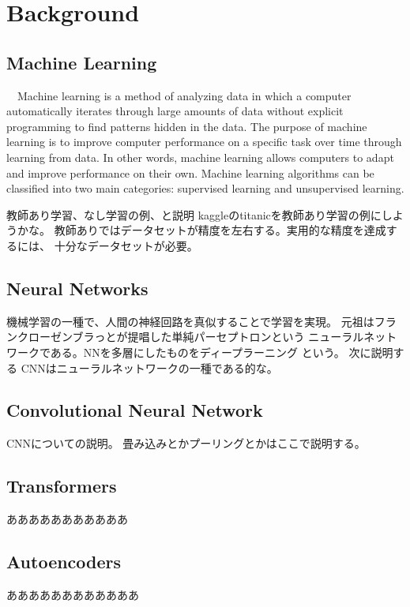 \chapter{Background}
\section{Machine Learning}

　Machine learning is a method of analyzing data in which a 
computer automatically iterates through large amounts of data 
without explicit programming to find patterns hidden in the data. 
The purpose of machine learning is to improve computer performance 
on a specific task over time through learning from data.
In other words, machine learning allows computers to adapt 
and improve performance on their own. 
Machine learning algorithms can be classified into two main 
categories: supervised learning and unsupervised learning. 
 
教師あり学習、なし学習の例、と説明
kaggleのtitanicを教師あり学習の例にしようかな。
教師ありではデータセットが精度を左右する。実用的な精度を達成するには、
十分なデータセットが必要。

\section{Neural Networks}
機械学習の一種で、人間の神経回路を真似することで学習を実現。
元祖はフランクローゼンブラっとが提唱した単純パーセプトロンという
ニューラルネットワークである。NNを多層にしたものをディープラーニング
という。
次に説明する CNNはニューラルネットワークの一種である的な。
\section{Convolutional Neural Network}
CNNについての説明。
畳み込みとかプーリングとかはここで説明する。

\section{Transformers}
あああああああああああ

\section{Autoencoders} 
ああああああああああああ